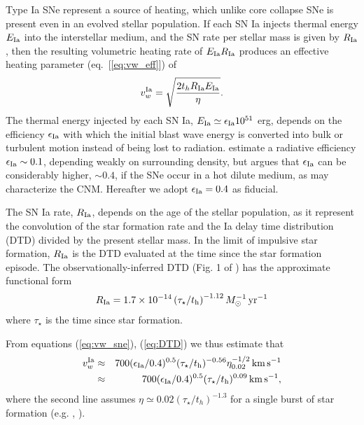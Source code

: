 \documentclass[usenatbib,fleqn]{mn2e}
\newcommand{\RateIa}{R_{\rm Ia}}
\begin{document}
Type Ia SNe represent a source of heating, which unlike core collapse
SNe is present even in an evolved stellar population.  If each SN Ia
injects thermal energy $E_{\rm Ia}$ into the interstellar medium, and
the SN rate per stellar mass is given by $R_{\rm Ia}$, then the
resulting volumetric heating rate of $E_{\rm Ia}R_{\rm Ia}$ produces
an effective heating parameter (eq.~[\ref{eq:vw_eff}])
of \begin{align} v_{w}^{\rm Ia} =\sqrt{\frac{2 t_h R_{\rm Ia} E_{\rm
        Ia}}{\eta}} \label{eq:vw_sne}.
\end{align} The thermal energy injected by each SN Ia, $E_{\rm Ia} \simeq
\epsilon_{\rm Ia} 10^{51}$ erg, depends on the efficiency $\epsilon_{\rm Ia}$
with which the initial blast wave energy is converted into bulk or turbulent
motion instead of being lost to radiation.  \cite{Thornton+98}
estimate a radiative efficiency $\epsilon_{\rm Ia} \sim 0.1$,
depending weakly on surrounding density, but \citet{Sharma+14} argues
that $\epsilon_{\rm Ia}$ can be considerably higher, $\sim 0.4$, if
the SNe occur in a hot dilute medium, as may characterize the CNM.  Hereafter we adopt $\epsilon_{\rm Ia} = 0.4$ as fiducial.

The SN Ia rate, $\RateIa$, depends on the age of the stellar
population, as it represent the convolution of the star formation rate
and the Ia delay time distribution (DTD) divided by the present
stellar mass.  In the limit of impulsive star formation, $\RateIa$ is
the DTD evaluated at the time since the star formation episode.  The
observationally-inferred DTD (Fig. 1 of \citealt{MaozMannucci+:2012a})
has the approximate functional form \begin{align} R_{\rm Ia}
  =1.7\times 10^{-14}\left(\tau_{\star}/t_{\rm h}\right)^{-1.12}
  M_{\odot}^{-1}\,{\rm yr^{-1}}
\label{eq:DTD}
  \end{align}
  where $\tau_{\star}$ is the time since star formation.

From equations (\ref{eq:vw_sne}), (\ref{eq:DTD}) we thus estimate that 
  \begin{eqnarray} 
    v_{w}^{\rm Ia} &\approx& 700(\epsilon_{\rm
      Ia}/0.4)^{0.5}(\tau_{\star}/t_{\rm h})^{-0.56}\eta_{0.02}^{-1/2}\,{\rm km
      \,s^{-1}} \nonumber \\
&\approx& 700(\epsilon_{\rm
      Ia}/0.4)^{0.5}(\tau_{\star}/t_{\rm h})^{0.09}\,{\rm km
      \,s^{-1}},
\label{eq:vIa}
  \end{eqnarray}
  where the second line assumes $\eta\simeq 0.02
  (\tau_{\star}/t_h)^{-1.3}$ for a single burst of star formation
  (e.g. , \citealt{Ciotti+91}).
\end{document}

